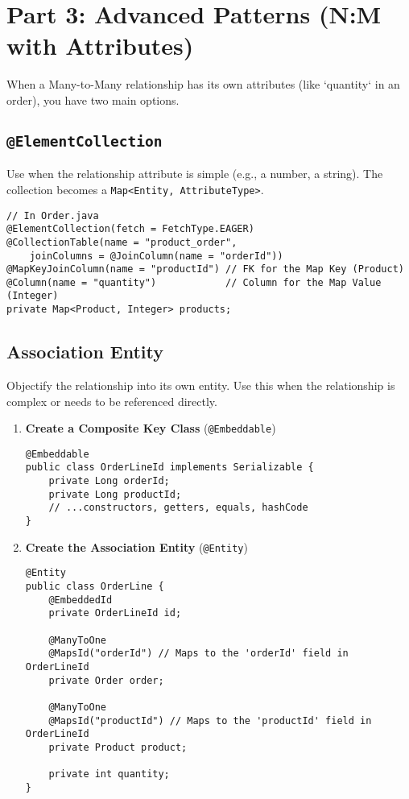 \section*{Part 3: Advanced Patterns (N:M with Attributes)}
When a Many-to-Many relationship has its own attributes (like `quantity` in an order), you have two main options.

\subsection*{\texttt{@ElementCollection}}
Use when the relationship attribute is simple (e.g., a number, a string). The collection becomes a \texttt{Map<Entity, AttributeType>}.
\begin{lstlisting}
// In Order.java
@ElementCollection(fetch = FetchType.EAGER)
@CollectionTable(name = "product_order", 
    joinColumns = @JoinColumn(name = "orderId"))
@MapKeyJoinColumn(name = "productId") // FK for the Map Key (Product)
@Column(name = "quantity")            // Column for the Map Value (Integer)
private Map<Product, Integer> products;
\end{lstlisting}

\subsection*{Association Entity}
Objectify the relationship into its own entity. Use this when the relationship is complex or needs to be referenced directly.
\begin{enumerate}
    \item \textbf{Create a Composite Key Class} (\texttt{@Embeddable})
    \begin{lstlisting}
@Embeddable
public class OrderLineId implements Serializable {
    private Long orderId;
    private Long productId;
    // ...constructors, getters, equals, hashCode
}
    \end{lstlisting}
    \item \textbf{Create the Association Entity} (\texttt{@Entity})
    \begin{lstlisting}
@Entity
public class OrderLine {
    @EmbeddedId
    private OrderLineId id;

    @ManyToOne
    @MapsId("orderId") // Maps to the 'orderId' field in OrderLineId
    private Order order;

    @ManyToOne
    @MapsId("productId") // Maps to the 'productId' field in OrderLineId
    private Product product;

    private int quantity;
}
    \end{lstlisting}
\end{enumerate}

